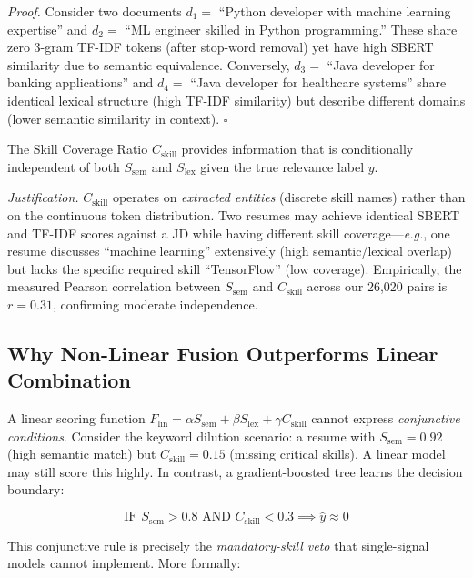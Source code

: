 \documentclass{llncs}
\begin{document}
\textit{Proof.} Consider two documents $d_1 =$ ``Python developer with machine learning expertise'' and $d_2 =$ ``ML engineer skilled in Python programming.'' These share zero 3-gram TF-IDF tokens (after stop-word removal) yet have high SBERT similarity due to semantic equivalence. Conversely, $d_3 =$ ``Java developer for banking applications'' and $d_4 =$ ``Java developer for healthcare systems'' share identical lexical structure (high TF-IDF similarity) but describe different domains (lower semantic similarity in context). \hfill $\square$

\begin{proposition}\label{prop:skill}
The Skill Coverage Ratio $C_\text{skill}$ provides information that is conditionally independent of both $S_\text{sem}$ and $S_\text{lex}$ given the true relevance label $y$.
\end{proposition}

\textit{Justification.} $C_\text{skill}$ operates on \textit{extracted entities} (discrete skill names) rather than on the continuous token distribution. Two resumes may achieve identical SBERT and TF-IDF scores against a JD while having different skill coverage---\textit{e.g.}, one resume discusses ``machine learning'' extensively (high semantic/lexical overlap) but lacks the specific required skill ``TensorFlow'' (low coverage). Empirically, the measured Pearson correlation between $S_\text{sem}$ and $C_\text{skill}$ across our 26,020 pairs is $r = 0.31$, confirming moderate independence.

\subsection{Why Non-Linear Fusion Outperforms Linear Combination}

A linear scoring function $F_\text{lin} = \alpha S_\text{sem} + \beta S_\text{lex} + \gamma C_\text{skill}$ cannot express \textit{conjunctive conditions}. Consider the keyword dilution scenario: a resume with $S_\text{sem} = 0.92$ (high semantic match) but $C_\text{skill} = 0.15$ (missing critical skills). A linear model may still score this highly. In contrast, a gradient-boosted tree learns the decision boundary:

\begin{equation}
    \text{IF } S_\text{sem} > 0.8 \text{ AND } C_\text{skill} < 0.3 \implies \hat{y} \approx 0
\end{equation}

This conjunctive rule is precisely the \textit{mandatory-skill veto} that single-signal models cannot implement. More formally:
\end{document}
